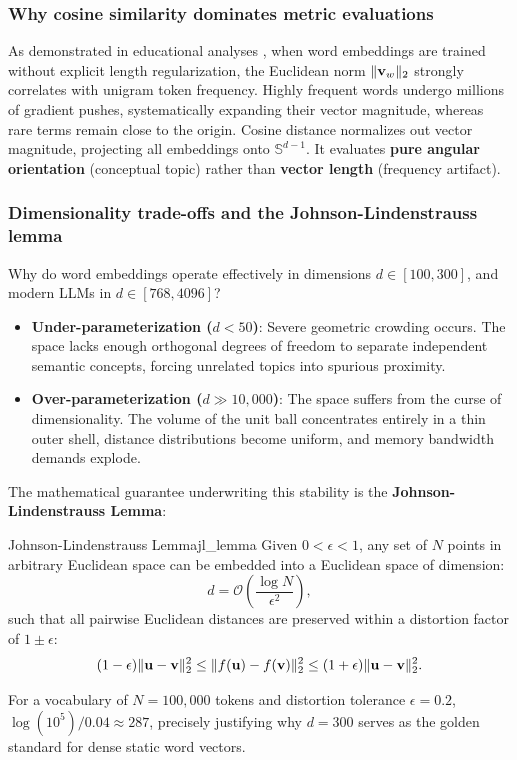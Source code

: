 \documentclass[../../main.tex]{subfiles}
\begin{document}
\subsubsection{Why cosine similarity dominates metric evaluations}
As demonstrated in educational analyses \cite{enkk2023embeddings}, when word embeddings are trained without explicit length regularization, the Euclidean norm $\|\mathbf{v}_w\|_2$ strongly correlates with unigram token frequency. Highly frequent words undergo millions of gradient pushes, systematically expanding their vector magnitude, whereas rare terms remain close to the origin.
Cosine distance normalizes out vector magnitude, projecting all embeddings onto $\mathbb{S}^{d-1}$. It evaluates \textbf{pure angular orientation} (conceptual topic) rather than \textbf{vector length} (frequency artifact).

\subsubsection{Dimensionality trade-offs and the Johnson-Lindenstrauss lemma}
\label{subsec:johnson_lindenstrauss}

Why do word embeddings operate effectively in dimensions $d \in [100, 300]$, and modern LLMs in $d \in [768, 4096]$?
\begin{itemize}
    \item \textbf{Under-parameterization ($d < 50$)}: Severe geometric crowding occurs. The space lacks enough orthogonal degrees of freedom to separate independent semantic concepts, forcing unrelated topics into spurious proximity.
    \item \textbf{Over-parameterization ($d \gg 10{,}000$)}: The space suffers from the curse of dimensionality. The volume of the unit ball concentrates entirely in a thin outer shell, distance distributions become uniform, and memory bandwidth demands explode.
\end{itemize}

The mathematical guarantee underwriting this stability is the \textbf{Johnson-Lindenstrauss Lemma}:
\begin{theorem}{Johnson-Lindenstrauss Lemma}{jl_lemma}
Given $0 < \epsilon < 1$, any set of $N$ points in arbitrary Euclidean space can be embedded into a Euclidean space of dimension:
\begin{equation}
\label{eq:jl_dimension}
d = \mathcal{O}\left( \frac{\log N}{\epsilon^2} \right),
\end{equation}
such that all pairwise Euclidean distances are preserved within a distortion factor of $1 \pm \epsilon$:
\begin{equation}
\label{eq:jl_bound}
(1 - \epsilon) \|\mathbf{u} - \mathbf{v}\|_2^2 \le \|f(\mathbf{u}) - f(\mathbf{v})\|_2^2 \le (1 + \epsilon) \|\mathbf{u} - \mathbf{v}\|_2^2.
\end{equation}
\end{theorem}
For a vocabulary of $N = 100{,}000$ tokens and distortion tolerance $\epsilon = 0.2$, $\log(10^5) / 0.04 \approx 287$, precisely justifying why $d = 300$ serves as the golden standard for dense static word vectors.
\end{document}
